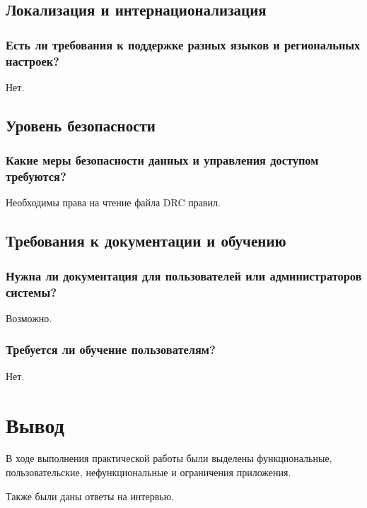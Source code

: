 \subsection{Локализация и интернационализация}

\subsubsection{Есть ли требования к поддержке разных языков
и региональных настроек?}

Нет.

\subsection{Уровень безопасности}
\subsubsection{Какие меры безопасности данных и управления доступом требуются?}

Необходимы права на чтение файла DRC правил.

\subsection{Требования к документации и обучению}
\subsubsection{Нужна ли документация для пользователей
или администраторов системы?}

Возможно.

\subsubsection{Требуется ли обучение пользователям?}

Нет.

\clearpage

\section*{\LARGE Вывод}

В ходе выполнения практической работы были выделены
функциональные, пользовательские, нефункциональные
и ограничения приложения.\par
Также были даны ответы на интервью.

